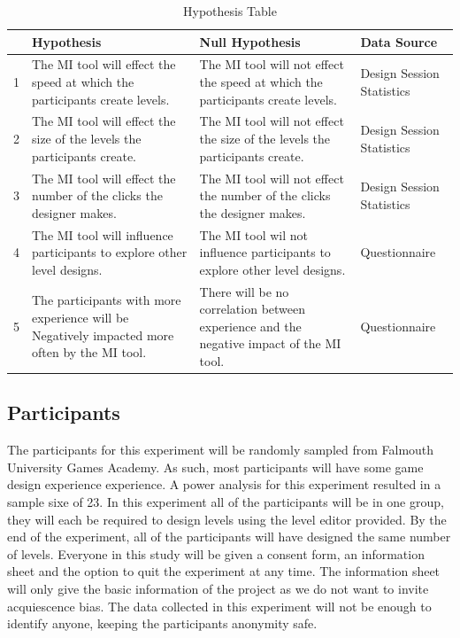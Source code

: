\documentclass[journal]{IEEEtran}
\begin{document}
\begin{table}[h]
		\centering
		\caption{Hypothesis Table}
		\label{hyp}
		\def\arraystretch{1.5}
		\begin{tabular}{|c|p{7cm}|p{7cm}|p{1.75cm}|}
			\hline
			& \textbf{Hypothesis}& \textbf{Null Hypothesis} & \textbf{Data Source}\\\hline
			1 & The MI tool will effect the speed at which the participants create levels.
			& The MI tool will not effect the speed at which the participants create levels.
			& Design Session Statistics\\ \hline
			
			2 & The MI tool will effect the size of the levels the participants create.
			&  The MI tool will not effect the size of the levels the participants create.
			& Design Session Statistics\\ \hline

			3 & The MI tool will effect the number of the clicks the designer makes.
			&  The MI tool will not effect the number of the clicks the designer makes.
			& Design Session Statistics\\ \hline

			4 & The MI tool will influence participants to explore other level designs.
			& The MI tool wil not influence participants to explore other level designs.
			&  Questionnaire\\ \hline

		          5 & The participants with more experience will be Negatively impacted more often by the MI tool.
			&  There will be no correlation between experience and the negative impact of the MI tool.
			& Questionnaire\\ \hline
			
		\end{tabular}
\end{table}

\subsection{Participants}
The participants for this experiment will be randomly sampled from Falmouth University Games Academy. As such, most participants will have some game design experience experience. A power analysis for this experiment resulted in a sample sixe of 23.  In this experiment all of the participants will be in one group, they will each be required to design levels using the level editor provided. By the end of the experiment, all of the participants will have designed the same number of levels. Everyone in this study will be given a consent form, an information sheet and the option to quit the experiment at any time. The information sheet will only give the basic information of the project as we do not want to invite acquiescence bias\cite{watson1992correcting}. The data collected in this experiment will not be enough to identify anyone, keeping the participants anonymity safe.
\end{document}
